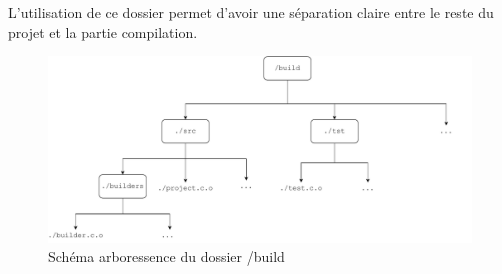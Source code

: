     L'utilisation de ce dossier permet d'avoir une séparation claire entre le reste du projet et la partie 
compilation.

\begin{center}
    \begin{figure}[H]
        \centering
        \includegraphics[width=.8\textwidth]{img/build_dir.pdf}
        \caption{Schéma arboressence du dossier /build}
        \label{fig:build_dir}
\end{figure}
\end{center}



